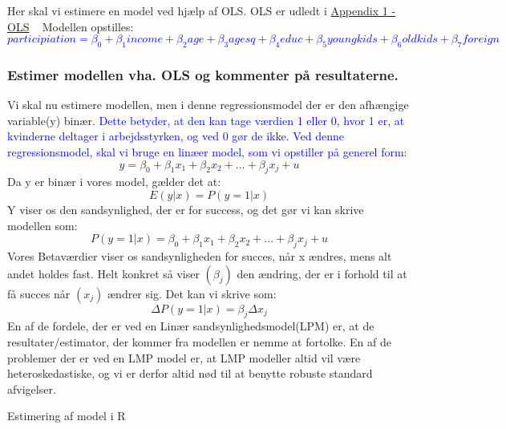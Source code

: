 \documentclass[
  10pt,
]{article}
\begin{document}
Her skal vi estimere en model ved hjælp af OLS. OLS er udledt i
\hyperref[sec:OLS]{Appendix 1 - OLS} ~ Modellen opstilles:
\textcolor{blue}{
\[ participiation=\beta_0+\beta_1income+\beta_2age+\beta_3agesq+\beta_4educ+\beta_5youngkids+\beta_6oldkids+\beta_7foreign\] }

\hypertarget{estimer-modellen-vha.-ols-og-kommenter-puxe5-resultaterne.-1}{%
\subsubsection{Estimer modellen vha. OLS og kommenter på
resultaterne.}\label{estimer-modellen-vha.-ols-og-kommenter-puxe5-resultaterne.-1}}

Vi skal nu estimere modellen, men i denne regressionsmodel der er den
afhængige variable(y) binær.
\textcolor{blue}{Dette betyder, at den kan tage værdien 1 eller 0, hvor 1 er, at kvinderne deltager i arbejdsstyrken, og ved 0 gør de ikke. Ved denne regressionsmodel, skal vi bruge en linæer model, som vi opstiller på generel form:}
\[y=\beta_0+\beta_1x_1+\beta_2x_2+...+\beta_jx_j+u\] Da y er binær i
vores model, gælder det at: \[ E(y|x)=P(y=1|x)\] Y viser os den
sandsynlighed, der er for success, og det gør vi kan skrive modellen
som: \[P(y=1|x)=\beta_0+\beta_1x_1+\beta_2x_2+...+\beta_jx_j+u\] Vores
Betaværdier viser os sandsynligheden for succes, når x ændres, mens alt
andet holdes fast. Helt konkret så viser \((\beta_j)\) den ændring, der
er i forhold til at få succes når \((x_j)\) ændrer sig. Det kan vi
skrive som: \[\Delta P(y=1|x) = \beta_j\Delta x_j\] En af de fordele,
der er ved en Linær sandsynlighedsmodel(LPM) er, at de
resultater/estimator, der kommer fra modellen er nemme at fortolke. En
af de problemer der er ved en LMP model er, at LMP modeller altid vil
være heteroskedastiske, og vi er derfor altid nød til at benytte robuste
standard afvigelser.

Estimering af model i R
\end{document}

